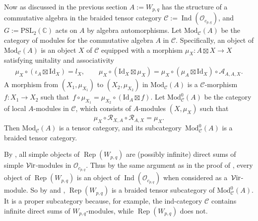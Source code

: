 \documentclass[pdftex]{sigma}
\numberwithin{equation}{section}
\theoremstyle{definition}
\begin{document}
Now as discussed in the previous section $A:=W_{p,q}$ has the structure of a commutative algebra in the braided tensor category $\mathcal{C}:=\operatorname{Ind}(\mathcal{O}_{c_{p,q}})$, and $G:=\mathrm{PSL}_2(\mathbb{C})$ acts on $A$ by algebra automorphisms. Let $\mathrm{Mod}_\mathcal{C}(A)$ be the category of modules for the commutative algebra $A$ in $\mathcal{C}$. Specifically, an object of $\mathrm{Mod}_\mathcal{C}(A)$ is an object $X$ of $\mathcal{C}$ equipped with a morphism $\mu_X\colon A\boxtimes X\rightarrow X$ satisfying unitality and associativity
\begin{gather*}
\mu_X\circ(\iota_A\boxtimes\mathrm{Id}_X) = l_X,\qquad\mu_X\circ(\mathrm{Id}_X\boxtimes\mu_X)=\mu_X\circ(\mu_A\boxtimes\mathrm{Id}_X)\circ\mathcal{A}_{A,A,X}.
\end{gather*}
A morphism from $(X_1,\mu_{X_1})$ to $(X_2,\mu_{X_2})$ in $\mathrm{Mod}_\mathcal{C}(A)$ is a $\mathcal{C}$-morphism $f\colon X_1\rightarrow X_2$ such that~${
f\circ\mu_{X_1}=\mu_{X_2}\circ (\mathrm{Id}_A\boxtimes f)}$.
Let $\mathrm{Mod}^0_\mathcal{C}(A)$ be the category of local $A$-modules in $\mathcal{C}$, which consists of $A$-modules $(X,\mu_X)$ such that
\[
\mu_X\circ\mathcal{R}_{X,A}\circ\mathcal{R}_{A,X}=\mu_X.
\]
Then $\mathrm{Mod}_\mathcal{C}(A)$ is a tensor category, and its subcategory~$\mathrm{Mod}_\mathcal{C}^0(A)$ is a braided tensor category.

By \cite[Proposition 4.14 and Theorem 5.13]{TW2}, all simple objects of $\operatorname{Rep}(W_{p,q})$ are (possibly infinite) direct sums of simple $\mathcal{V}{\rm ir}$-modules in $\mathcal{O}_{c_{p,q}}$. Thus by the same argument as in the proof of \cite[Proposition 3.1.3]{CMY2}, every object of $\operatorname{Rep}(W_{p,q})$ is an object of $\operatorname{Ind}(\mathcal{O}_{c_{p,q}})$ when considered as a~$\mathcal{V}{\rm ir}$-module.
So by \cite[Theorem 3.4]{HKL} and \cite[Theorem 3.65]{CKM1}, $\operatorname{Rep}(W_{p,q})$ is a braided tensor subcategory of $\mathrm{Mod}^0_\mathcal{C}(A)$. It is a proper subcategory because, for example, the ind-category $\mathcal{C}$ contains infinite direct sums of $W_{p,q}$-modules, while $\operatorname{Rep}(W_{p,q})$ does not.
\end{document}
